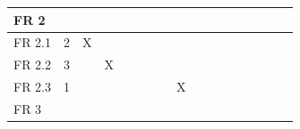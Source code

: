 \documentclass[a4paper,12pt]{article}
\begin{document}
\begin{table}[]
{\begin{tabular}{|l|c|c|c|c|c|c|c|c|c|c|c|c|c|c|c|c|}
FR 2   &                               &                             &                             &                             &                             &                             &                             &                             &                             &                             &                             &                             &                             &                             &                             &                             \\ \hline
FR 2.1 & 2                             & X                           &                             &                             &                             &                             &                             &                             &                             &                             &                             &                             &                             &                             &                             &                             \\
FR 2.2 & 3                             &                             & X                           &                             &                             &                             &                             &                             &                             &                             &                             &                             &                             &                             &                             &                             \\
FR 2.3 & 1                             &                             &                             &                             &                             &                             &                             & X                           &                             &                             &                             &                             &                             &                             &                             &                             \\ \hline
FR 3   &                               &                             &                             &                             &                             &                             &                             &                             &                             &                             &                             &                             &                             &                             &                             &                             \\ \hline

\end{tabular}}
\end{table}
\end{document}
